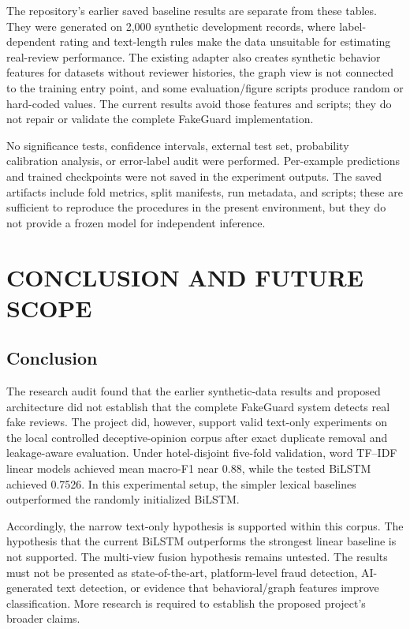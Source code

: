 \documentclass[12pt,a4paper]{report}
\begin{document}
The repository's earlier saved baseline results are separate from these tables. They were generated on 2,000 synthetic development records, where label-dependent rating and text-length rules make the data unsuitable for estimating real-review performance. The existing adapter also creates synthetic behavior features for datasets without reviewer histories, the graph view is not connected to the training entry point, and some evaluation/figure scripts produce random or hard-coded values. The current results avoid those features and scripts; they do not repair or validate the complete FakeGuard implementation.

No significance tests, confidence intervals, external test set, probability calibration analysis, or error-label audit were performed. Per-example predictions and trained checkpoints were not saved in the experiment outputs. The saved artifacts include fold metrics, split manifests, run metadata, and scripts; these are sufficient to reproduce the procedures in the present environment, but they do not provide a frozen model for independent inference.

\chapter{CONCLUSION AND FUTURE SCOPE}

\section{Conclusion}

The research audit found that the earlier synthetic-data results and proposed architecture did not establish that the complete FakeGuard system detects real fake reviews. The project did, however, support valid text-only experiments on the local controlled deceptive-opinion corpus after exact duplicate removal and leakage-aware evaluation. Under hotel-disjoint five-fold validation, word TF--IDF linear models achieved mean macro-F1 near 0.88, while the tested BiLSTM achieved 0.7526. In this experimental setup, the simpler lexical baselines outperformed the randomly initialized BiLSTM.

Accordingly, the narrow text-only hypothesis is supported within this corpus. The hypothesis that the current BiLSTM outperforms the strongest linear baseline is not supported. The multi-view fusion hypothesis remains untested. The results must not be presented as state-of-the-art, platform-level fraud detection, AI-generated text detection, or evidence that behavioral/graph features improve classification. More research is required to establish the proposed project's broader claims.
\end{document}
